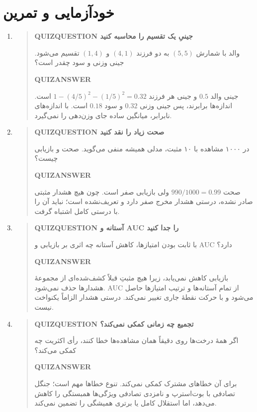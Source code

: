 \section{خودآزمایی و تمرین}
\begin{enumerate}
\item\begin{quote}\textbf{QUIZQUESTION جینیِ یک تقسیم را محاسبه کنید}\par 
والد با شمارش $(5,5)$ به دو فرزند $(4,1)$ و $(1,4)$ تقسیم می‌شود. جینی وزنی و سود چقدر است؟
\par\textbf{QUIZANSWER}\par جینی والد $0.5$ و جینی هر فرزند $1-(4/5)^2-(1/5)^2=0.32$ است. اندازه‌ها برابرند، پس جینی وزنی $0.32$ و سود $0.18$ است. با اندازه‌های نابرابر، میانگین ساده جای وزن‌دهی را نمی‌گیرد.\par 
\end{quote}
\item\begin{quote}\textbf{QUIZQUESTION صحت زیاد را نقد کنید}\par 
در ۱۰۰۰ مشاهده با ۱۰ مثبت، مدلی همیشه منفی می‌گوید. صحت و بازیابی چیست؟
\par\textbf{QUIZANSWER}\par صحت $990/1000=0.99$ ولی بازیابی صفر است. چون هیچ هشدار مثبتی صادر نشده، درستی هشدار مخرج صفر دارد و تعریف‌نشده است؛ نباید آن را با درستی کامل اشتباه گرفت.\par 
\end{quote}
\item\begin{quote}\textbf{QUIZQUESTION آستانه و AUC را جدا کنید}\par 
با ثابت بودن امتیازها، کاهش آستانه چه اثری بر بازیابی و AUC دارد؟
\par\textbf{QUIZANSWER}\par بازیابی کاهش نمی‌یابد، زیرا هیچ مثبتِ قبلاً کشف‌شده‌ای از مجموعهٔ هشدارها حذف نمی‌شود. AUC از تمام آستانه‌ها و ترتیب امتیازها حاصل می‌شود و با حرکت نقطهٔ جاری تغییر نمی‌کند. درستی هشدار الزاماً یکنواخت نیست.\par 
\end{quote}
\item\begin{quote}\textbf{QUIZQUESTION تجمیع چه زمانی کمکی نمی‌کند؟}\par 
اگر همهٔ درخت‌ها روی دقیقاً همان مشاهده‌ها خطا کنند، رأی اکثریت چه کمکی می‌کند؟
\par\textbf{QUIZANSWER}\par برای آن خطاهای مشترک کمکی نمی‌کند. تنوع خطاها مهم است؛ جنگل تصادفی با بوت‌استرپ و نامزدی تصادفی ویژگی‌ها همبستگی را کاهش می‌دهد، اما استقلال کامل یا برتری همیشگی را تضمین نمی‌کند.\par 

\end{quote}
\end{enumerate}
